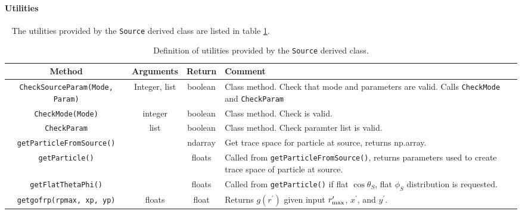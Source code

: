\paragraph{Utilities} ~\newline
\noindent
The utilities provided by the \texttt{Source} derived class are listed
in table \ref{Tab:Source:Utilities}.
\begin{table}[h]
  \caption{
    Definition of utilities provided by the \texttt{Source} derived
    class. 
  }
  \label{Tab:Source:Utilities}
  \begin{center}
    \begin{tabular}{|c|c|c|p{5cm}|}
      \hline
      \textbf{Method} & \textbf{Arguments} & \textbf{Return}  & \textbf{Comment}                                                 \\
      \hline
      \texttt{CheckSourceParam(Mode, Param)} & Integer, list & boolean & Class method. Check that mode and parameters are valid.
                                                                         Calls \texttt{CheckMode} and \texttt{CheckParam}                  \\
      \texttt{CheckMode(Mode)}               & integer & boolean       & Class method. Check is valid.                                     \\
      \texttt{CheckParam}                    & list    & boolean       & Class method. Check paramter list is valid.                       \\
      \texttt{getParticleFromSource()}       &         & ndarray       & Get trace space for particle at source, returns np.array.         \\
      \texttt{getParticle()}                 &         & floats        & Called from \texttt{getParticleFromSource()}, returns parameters
                                                                         used to create trace space of particle at source.                 \\
      \texttt{getFlatThetaPhi()}             &         & floats        & Called from \texttt{getParticle()} if flat $\cos\theta_S$, flat
                                                                         $\phi_S$ distribution is requested.                               \\
      \texttt{getgofrp(rpmax, xp, yp)}       & floats  & float         & Returns $g(r^\prime)$ given input $r^\prime_{\rm max}$, $x^\prime$,
                                                                         and $y^\prime$.                                                    \\

\end{tabular}
\end{center}
\end{table}
